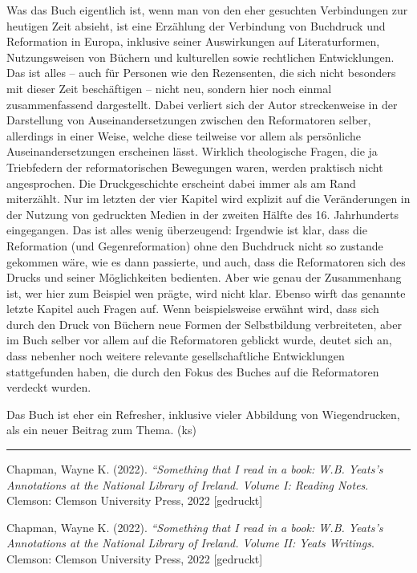 \documentclass[a4paper,
fontsize=11pt,
oneside,
numbers=noperiodatend,
parskip=half-,
bibliography=totoc,
final
]{scrartcl}
\begin{document}
Was das Buch eigentlich ist, wenn man von den eher gesuchten
Verbindungen zur heutigen Zeit absieht, ist eine Erzählung der
Verbindung von Buchdruck und Reformation in Europa, inklusive seiner
Auswirkungen auf Literaturformen, Nutzungsweisen von Büchern und
kulturellen sowie rechtlichen Entwicklungen. Das ist alles -- auch für
Personen wie den Rezensenten, die sich nicht besonders mit dieser Zeit
beschäftigen -- nicht neu, sondern hier noch einmal zusammenfassend
dargestellt. Dabei verliert sich der Autor streckenweise in der
Darstellung von Auseinandersetzungen zwischen den Reformatoren selber,
allerdings in einer Weise, welche diese teilweise vor allem als
persönliche Auseinandersetzungen erscheinen lässt. Wirklich theologische
Fragen, die ja Triebfedern der reformatorischen Bewegungen waren, werden
praktisch nicht angesprochen. Die Druckgeschichte erscheint dabei immer
als am Rand miterzählt. Nur im letzten der vier Kapitel wird explizit
auf die Veränderungen in der Nutzung von gedruckten Medien in der
zweiten Hälfte des 16. Jahrhunderts eingegangen. Das ist alles wenig
überzeugend: Irgendwie ist klar, dass die Reformation (und
Gegenreformation) ohne den Buchdruck nicht so zustande gekommen wäre,
wie es dann passierte, und auch, dass die Reformatoren sich des Drucks
und seiner Möglichkeiten bedienten. Aber wie genau der Zusammenhang ist,
wer hier zum Beispiel wen prägte, wird nicht klar. Ebenso wirft das
genannte letzte Kapitel auch Fragen auf. Wenn beispielsweise erwähnt
wird, dass sich durch den Druck von Büchern neue Formen der
Selbstbildung verbreiteten, aber im Buch selber vor allem auf die
Reformatoren geblickt wurde, deutet sich an, dass nebenher noch weitere
relevante gesellschaftliche Entwicklungen stattgefunden haben, die durch
den Fokus des Buches auf die Reformatoren verdeckt wurden.

Das Buch ist eher ein Refresher, inklusive vieler Abbildung von
Wiegendrucken, als ein neuer Beitrag zum Thema. (ks)

\begin{center}\rule{0.5\linewidth}{0.5pt}\end{center}

\pagebreak
Chapman, Wayne K. (2022). \emph{``Something that I read in a book: W.B.
Yeats's Annotations at the National Library of Ireland. Volume I:
Reading Notes}. Clemson: Clemson University Press, 2022 {[}gedruckt{]}

Chapman, Wayne K. (2022). \emph{``Something that I read in a book: W.B.
Yeats's Annotations at the National Library of Ireland. Volume II: Yeats
Writings}. Clemson: Clemson University Press, 2022 {[}gedruckt{]}
\end{document}
